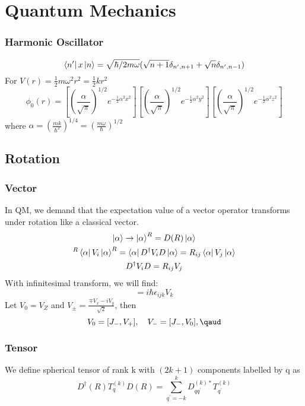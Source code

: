 \chapter{Quantum Mechanics}
\subsection{Harmonic Oscillator}
\[
    \bra{n'}x\ket{n}=\sqrt{\hbar/2m\omega}(\sqrt{n+1}\delta_{n',n+1}+\sqrt{n}\delta_{n',n-1})
    \]
For $V(r)=\frac{1}{2}m\omega^2r^2=\frac{1}{2}kr^2$
\[
    \phi_0(r)=[(\frac{\alpha}{\sqrt{\pi}})^{1/2}e^{-\frac{1}{2}\alpha^2x^2}]
    [(\frac{\alpha}{\sqrt{\pi}})^{1/2}e^{-\frac{1}{2}\alpha^2y^2}]
    [(\frac{\alpha}{\sqrt{\pi}})^{1/2}e^{-\frac{1}{2}\alpha^2z^2}]
    \]
where $\alpha=(\frac{mk}{\hbar^2})^{1/4}=(\frac{m\omega}{\hbar})^{1/2}$

\section{Rotation}

\subsection{Vector}
In QM, we demand that the expectation value of a vector operator transforms
under rotation like a classical vector.
\begin{gather*}
    \ket{\alpha}\rightarrow\ket{\alpha}^R=D(R)\ket{\alpha}\\
    ^{R}\bra{\alpha}V_i\ket{\alpha}^R=\bra{\alpha}D^{\dag}V_{i}D\ket{\alpha}=R_{ij}\bra{\alpha}V_j\ket{\alpha}\\
    D^{\dag}V_{i}D=R_{ij}V_j
\end{gather*}
With infinitesimal transform, we will find:
\begin{equation}
    [J_i,V_j]=i\hbar\epsilon_{ijk}V_k
\end{equation}
Let $V_0 = V_Z$ and $V_{\pm} = \frac{\mp V_x -iV_y}{\sqrt{2}}$, 
then
\[
    V_0 = [J_-, V_+], \quad V_- = [J_-, V_0], \qaud 
\]

\subsection{Tensor}
We define spherical tensor of rank k with $(2k+1)$ components labelled by q
as
\begin{equation}
    D^{\dag}(R)T^{(k)}_{q}D(R)=\displaystyle\sum_{q^\prime=-k}^{k}D^{(k)*}_{qq^\prime}T^{(k)}_{q^\prime}
\end{equation}
